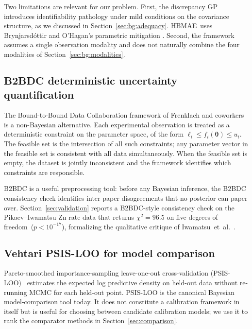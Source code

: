 \documentclass[12pt]{article}
\theoremstyle{plain}
\theoremstyle{definition}
\theoremstyle{remark}
\newcommand{\HBMAE}{HBMAE\xspace}
\begin{document}
Two limitations are relevant for our problem.  First, the discrepancy GP
introduces identifiability pathology under mild conditions on the
covariance structure, as we discussed in Section~\ref{sec:bg:adequacy}.
\HBMAE\ uses Brynjarsd\'ottir and O'Hagan's parametric mitigation
\citep{Brynjarsdottir2014}.  Second, the framework assumes a single
observation modality and does not naturally combine the four modalities of
Section~\ref{sec:bg:modalities}.

\subsection{B2BDC deterministic uncertainty quantification}\label{sec:sota:b2bdc}

The Bound-to-Bound Data Collaboration framework of Frenklach and
coworkers~\citep{Frenklach2007,Hegde2018,Oreluk2021} is a non-Bayesian
alternative.  Each experimental observation is treated as a deterministic
constraint on the parameter space, of the form
$\ell_i \le f_i(\boldsymbol\theta) \le u_i$.  The feasible set is the
intersection of all such constraints; any parameter vector in the feasible
set is consistent with all data simultaneously.  When the feasible set is
empty, the dataset is jointly inconsistent and the framework identifies
which constraints are responsible.

B2BDC is a useful preprocessing tool: before any Bayesian inference, the
B2BDC consistency check identifies inter-paper disagreements that no
posterior can paper over.  Section~\ref{sec:validation} reports a B2BDC-style
consistency check on the Pikaev--Iwamatsu Zn rate data that returns
$\chi^2 = 96.5$ on five degrees of freedom~($p<10^{-17}$), formalizing the
qualitative critique of Iwamatsu~et~al.~\citep{Iwamatsu2022}.

\subsection{Vehtari PSIS-LOO for model comparison}\label{sec:sota:psisloo}

Pareto-smoothed importance-sampling leave-one-out cross-validation
(PSIS-LOO)~\citep{Vehtari2017} estimates the expected log predictive density
on held-out data without re-running MCMC for each held-out point.  PSIS-LOO
is the canonical Bayesian model-comparison tool today.  It does not
constitute a calibration framework in itself but is useful for choosing
between candidate calibration models; we use it to rank the comparator
methods in Section~\ref{sec:comparison}.
\end{document}
